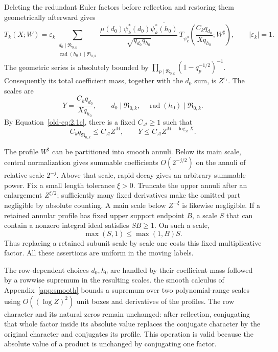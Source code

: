 \documentclass[12pt]{article}
\begin{document}
Deleting the redundant Euler factors before reflection and restoring
them geometrically afterward gives
\[
 T_k(X;W)
 =\varepsilon_k
 \sum_{\substack{d_0\mid\mathfrak R_{0,k}\\
                  \operatorname{rad}(h_0)\mid\mathfrak R_{0,k}}}
 \frac{\mu(d_0)\psi_k^*(d_0)\overline{\psi_k^*(h_0)}}
      {\sqrt{q_{d_0}q_{h_0}}}\,
 T_{\overline{\psi_k^0}}
   \left(\frac{C_kq_{d_0}}{Xq_{h_0}};W^\sharp\right),
 \qquad |\varepsilon_k|=1.
\]
The geometric series is absolutely bounded by
\(\prod_{p\mid\mathfrak R_{0,k}}(1-q_p^{-1/2})^{-1}\).
Consequently its total coefficient mass, together with the \(d_0\)
sum, is \(Z^{\epsilon_1}\).  The scales are
\begin{equation}
 Y=\frac{C_kq_{d_0}}{Xq_{h_0}},\qquad
 d_0\mid\mathfrak R_{0,k},\quad
 \operatorname{rad}(h_0)\mid\mathfrak R_{0,k}.
 \label{old-eq:2.1d}
\end{equation}
By Equation~\eqref{old-eq:2.1c}, there is a fixed \(C_{\mathcal A}\ge1\)
such that
\[
 C_kq_{\mathfrak R_{0,k}}\le C_{\mathcal A}Z^M,\qquad
 Y\le C_{\mathcal A}Z^{M-\log_ZX}.
\]

The profile \(W^\sharp\) can be partitioned into smooth annuli.
Below its main scale, central normalization gives summable
coefficients \(O(2^{-j/2})\) on the annuli of relative scale \(2^{-j}\).
Above that scale, rapid decay gives an arbitrary summable power.
Fix a small length tolerance \(\xi>0\).  Truncate the upper annuli
after an enlargement \(Z^{\xi/2}\); sufficiently many fixed derivatives
make the omitted part negligible by absolute counting.  A main scale
below \(Z^{-\xi}\) is likewise negligible.  If a retained annular
profile has fixed upper support endpoint \(B\), a scale \(S\) that
can contain a nonzero integral ideal satisfies \(SB\ge1\).  On such
a scale,
\[
 \max(S,1)\le\max(1,B)S.
\]
Thus replacing a retained subunit scale by scale one costs this fixed
multiplicative factor.  All these assertions are uniform in the moving labels.

The row-dependent choices \(d_0,h_0\) are handled by their coefficient
mass followed by a rowwise supremum in the resulting scales.
the smooth calculus of Appendix~\ref{app:smooth} bounds a supremum over two
polynomial-range scales using \(O((\log Z)^2)\) unit boxes and
derivatives of the profiles.  The row character and its natural zeros
remain unchanged: after reflection, conjugating that whole factor
inside its absolute value replaces the conjugate character by the
original character and conjugates its profile.  This operation is
valid because the absolute value of a product is unchanged by
conjugating one factor.
\end{document}
